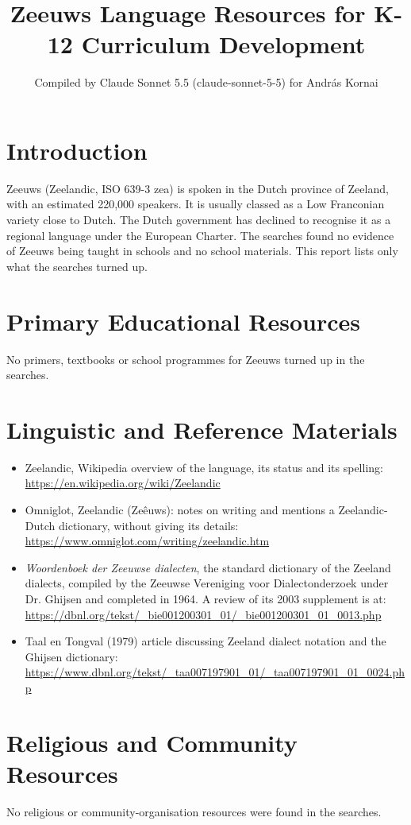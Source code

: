 \documentclass[12pt]{article}
\title{Zeeuws Language Resources for K-12 Curriculum Development}
\author{Compiled by Claude Sonnet 5.5 (claude-sonnet-5-5) for Andr\'as Kornai}
\date{}
\begin{document}
\maketitle

\section{Introduction}
Zeeuws (Zeelandic, ISO 639-3 zea) is spoken in the Dutch province of Zeeland, with an estimated 220,000 speakers. It is usually classed as a Low Franconian variety close to Dutch. The Dutch government has declined to recognise it as a regional language under the European Charter. The searches found no evidence of Zeeuws being taught in schools and no school materials. This report lists only what the searches turned up.

\section{Primary Educational Resources}
No primers, textbooks or school programmes for Zeeuws turned up in the searches.

\section{Linguistic and Reference Materials}
\begin{itemize}
\item Zeelandic, Wikipedia overview of the language, its status and its spelling: \url{https://en.wikipedia.org/wiki/Zeelandic}
\item Omniglot, Zeelandic (Ze\^euws): notes on writing and mentions a Zeelandic-Dutch dictionary, without giving its details: \url{https://www.omniglot.com/writing/zeelandic.htm}
\item \emph{Woordenboek der Zeeuwse dialecten}, the standard dictionary of the Zeeland dialects, compiled by the Zeeuwse Vereniging voor Dialectonderzoek under Dr. Ghijsen and completed in 1964. A review of its 2003 supplement is at: \url{https://dbnl.org/tekst/_bie001200301_01/_bie001200301_01_0013.php}
\item Taal en Tongval (1979) article discussing Zeeland dialect notation and the Ghijsen dictionary: \url{https://www.dbnl.org/tekst/_taa007197901_01/_taa007197901_01_0024.php}
\end{itemize}

\section{Religious and Community Resources}
No religious or community-organisation resources were found in the searches.
\end{document}
